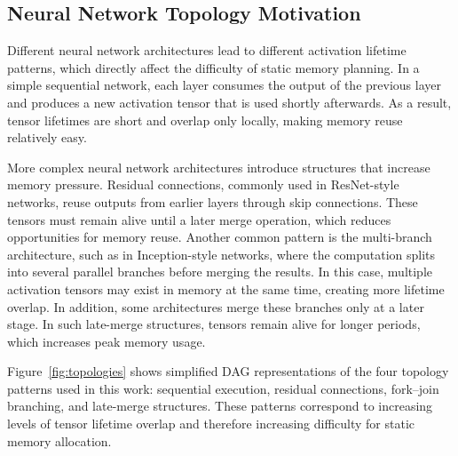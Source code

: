 \singlespacing  

\subsection{Neural Network Topology Motivation}

Different neural network architectures lead to different activation lifetime patterns, which directly affect the difficulty of static memory planning. In a simple sequential network, each layer consumes the output of the previous layer and produces a new activation tensor that is used shortly afterwards. As a result, tensor lifetimes are short and overlap only locally, making memory reuse relatively easy.

More complex neural network architectures introduce structures that increase memory pressure. Residual connections, commonly used in ResNet-style networks, reuse outputs from earlier layers through skip connections. These tensors must remain alive until a later merge operation, which reduces opportunities for memory reuse. Another common pattern is the multi-branch architecture, such as in Inception-style networks, where the computation splits into several parallel branches before merging the results. In this case, multiple activation tensors may exist in memory at the same time, creating more lifetime overlap. In addition, some architectures merge these branches only at a later stage. In such late-merge structures, tensors remain alive for longer periods, which increases peak memory usage.

Figure~\ref{fig:topologies} shows simplified DAG representations of the four topology patterns used in this work: sequential execution, residual connections, fork--join branching, and late-merge structures. These patterns correspond to increasing levels of tensor lifetime overlap and therefore increasing difficulty for static memory allocation.

